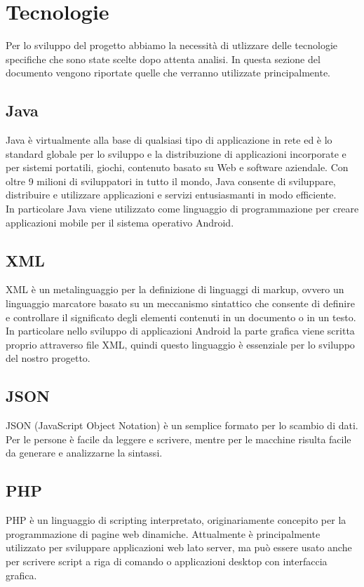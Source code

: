 \section{Tecnologie} 
\label{tecnologie}
Per lo sviluppo del progetto abbiamo la necessità di utlizzare delle tecnologie specifiche che sono state scelte dopo attenta analisi. 
In questa sezione del documento vengono riportate quelle che verranno utilizzate principalmente. 

\subsection{Java}
	
	Java è virtualmente alla base di qualsiasi tipo di applicazione in rete ed è lo standard globale per lo sviluppo e la distribuzione di applicazioni incorporate e per sistemi portatili, giochi, contenuto basato su Web e software aziendale. Con oltre 9 milioni di sviluppatori in tutto il mondo, Java consente di sviluppare, distribuire e utilizzare applicazioni e servizi entusiasmanti in modo efficiente. \\ 
	In particolare Java viene utilizzato come linguaggio di programmazione per creare applicazioni mobile per il sistema operativo Android.
	
\subsection{XML}
	
	XML è un metalinguaggio per la definizione di linguaggi di markup, ovvero un linguaggio marcatore basato su un meccanismo sintattico che consente di definire e controllare il significato degli elementi contenuti in un documento o in un testo.
	In particolare nello sviluppo di applicazioni Android la parte grafica viene scritta proprio attraverso file XML, quindi questo linguaggio è essenziale per lo sviluppo del nostro progetto.
	

\subsection{JSON}
	JSON (JavaScript Object Notation) è un semplice formato per lo scambio di dati. Per le persone è facile da leggere e scrivere, mentre per le macchine risulta facile da generare e analizzarne la sintassi.
	

\subsection{PHP}
	PHP è un linguaggio di scripting interpretato, originariamente concepito per la programmazione di pagine web dinamiche. 
	Attualmente è principalmente utilizzato per sviluppare applicazioni web lato server, ma può essere usato anche per scrivere script a riga di comando o applicazioni desktop con interfaccia grafica.
	
